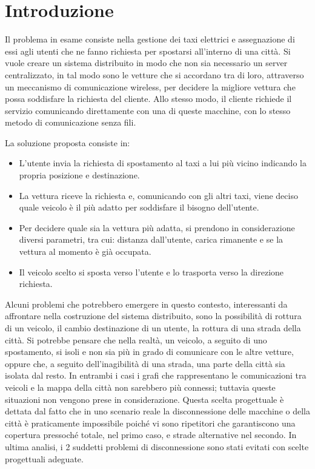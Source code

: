 \chapter{Introduzione}

Il problema in esame consiste nella gestione dei taxi elettrici e assegnazione di essi agli utenti che ne fanno richiesta per spostarsi all'interno di una città. Si vuole creare un sistema distribuito in modo che non sia necessario un server centralizzato, in tal modo sono le vetture che si accordano tra di loro, attraverso un meccanismo di comunicazione wireless, per decidere la migliore vettura che possa soddisfare la richiesta del cliente. Allo stesso modo, il cliente richiede il servizio comunicando direttamente con una di queste macchine, con lo stesso metodo di comunicazione senza fili. 

La soluzione proposta consiste in:
\begin{itemize}
	\item L'utente invia la richiesta di spostamento al taxi a lui più vicino indicando la propria posizione e destinazione.
	\item La vettura riceve la richiesta e, comunicando con gli altri taxi, viene deciso quale veicolo è il più adatto per soddisfare il bisogno dell'utente.
	\item Per decidere quale sia la vettura più adatta, si prendono in considerazione diversi parametri, tra cui: distanza dall'utente, carica rimanente e se la vettura al momento è già occupata.
	\item Il veicolo scelto si sposta verso l'utente e lo trasporta verso la direzione richiesta.
\end{itemize}

Alcuni problemi che potrebbero emergere in questo contesto, interessanti da affrontare nella costruzione del sistema distribuito, sono la possibilità di rottura di un veicolo, il cambio destinazione di un utente, la rottura di una strada della città.
Si potrebbe pensare che nella realtà, un veicolo, a seguito di uno spostamento, si isoli e non sia più in grado di comunicare con le altre vetture, oppure che, a seguito dell'inagibilità di una strada, una parte della città sia isolata dal resto. In entrambi i casi i grafi che rappresentano le comunicazioni tra veicoli e la mappa della città non sarebbero più connessi; tuttavia queste situazioni non vengono prese in considerazione. 
Questa scelta progettuale è dettata dal fatto che in uno scenario reale la disconnessione delle macchine o della città è praticamente impossibile poiché vi sono ripetitori che garantiscono una copertura pressoché totale, nel primo caso, e strade alternative nel secondo. In ultima analisi, i 2 suddetti problemi di disconnessione sono stati evitati con scelte progettuali adeguate.

